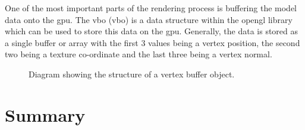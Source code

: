 One of the most important parts of the rendering process is buffering the model data onto the \acrshort{gpu}. The \acrlong{vbo} (\acrshort{vbo}) is a data structure within the \acrshort{opengl} library which can be used to store this data on the \acrshort{gpu}. Generally, the data is stored as a single buffer or array with the first 3 values being a vertex position, the second two being a texture co-ordinate and the last three being a vertex normal. 

\begin{figure}[htbp]
	{\centering
		\vspace{7px}
		\setlength{\fboxrule}{1pt}
		\caption{Diagram showing the structure of a vertex buffer object.}
	}
\end{figure}
\FloatBarrier

\section{Summary}








